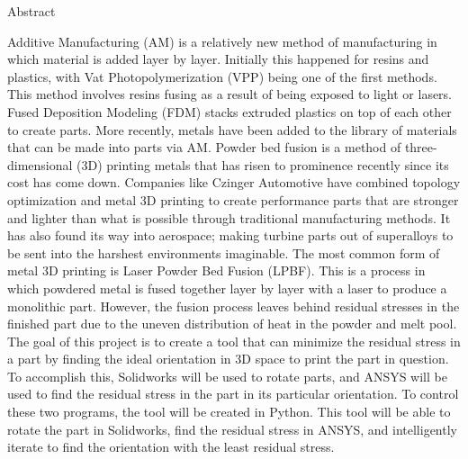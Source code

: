 {\Large \noindent Abstract}

Additive Manufacturing (AM) is a relatively new method of manufacturing in which material is added layer by layer.  Initially this happened for resins and plastics, with Vat Photopolymerization (VPP) being one of the first methods.  This method involves resins fusing as a result of being exposed to light or lasers.  Fused Deposition Modeling (FDM) stacks extruded plastics on top of each other to create parts.  More recently, metals have been added to the library of materials that can be made into parts via AM.
\newline \indent Powder bed fusion is a method of three-dimensional (3D) printing metals that has risen to prominence recently since its cost has come down.  Companies like Czinger Automotive have combined topology optimization and metal 3D printing to create performance parts that are stronger and lighter than what is possible through traditional manufacturing methods.  It has also found its way into aerospace; making turbine parts out of superalloys to be sent into the harshest environments imaginable. \newline \indent The most common form of metal 3D printing is Laser Powder Bed Fusion (LPBF).  This is a process in which powdered metal is fused together layer by layer with a laser to produce a monolithic part.  However, the fusion process leaves behind residual stresses in the finished part due to the uneven distribution of heat in the powder and melt pool.
\newline \indent The goal of this project is to create a tool that can minimize the residual stress in a part by finding the ideal orientation in 3D space to print the part in question.  To accomplish this, Solidworks will be used to rotate parts, and ANSYS will be used to find the residual stress in the part in its particular orientation.  To control these two programs, the tool will be created in Python.  This tool will be able to rotate the part in Solidworks, find the residual stress in ANSYS, and intelligently iterate to find the orientation with the least residual stress. 